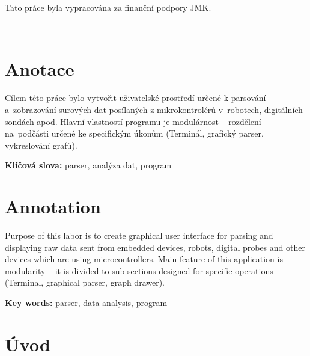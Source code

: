 \documentclass[12pt, a4paper, oneside]{article}
\newcommand{\D}{\medskip \noindent} %
\newcommand{\B}{\textbf} %
\begin{document}
\D Tato práce byla vypracována za finanční podpory JMK.
 

\newpage   %
~ %
\vspace{10mm}

\section*{Anotace }

    Cílem této práce bylo vytvořit uživatelské prostředí určené k parsování a~zobrazování surových dat posílaných z mikrokontrolérů v~robotech, digitálních sondách apod. 
Hlavní vlastností programu je modulárnost -- rozdělení na~podčásti určené ke specifickým úkonům (Terminál, grafický parser, vykreslování grafů).

\D \B{Klíčová slova:} parser, analýza dat, program

\section*{Annotation}

    Purpose of this labor is to create graphical user interface for parsing and displaying raw data sent from embedded devices, robots, digital probes and other devices which are using microcontrollers.
Main feature of this application is modularity -- it is divided to sub-sections designed for specific operations (Terminal, graphical parser, graph drawer).

\D \B{Key words:} parser, data analysis, program

\addtolength{\textheight}{30mm} %

\newpage

\setlength{\voffset}{-20mm} %

\tableofcontents  %

\addtolength{\textheight}{-30mm} %
\newpage
\setlength{\voffset}{0mm} %
\pagestyle{plain}
\section*{Úvod}
\end{document}
